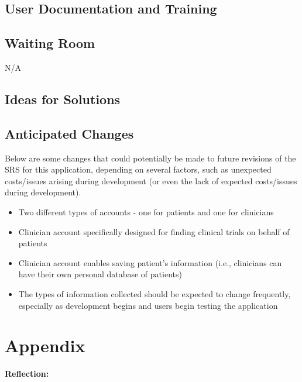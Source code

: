 \documentclass[12pt, titlepage]{article}
\begin{document}
\subsection{User Documentation and Training}

\subsection{Waiting Room}

N/A

\subsection{Ideas for Solutions}

\subsection{Anticipated Changes}

Below are some changes that could potentially be made to future 
revisions of the SRS for this application, depending on several factors,
such as unexpected costs/issues arising during development (or even the lack 
of expected costs/issues during development).

\begin{itemize}
    \item Two different types of accounts - one for patients and one for clinicians
    \item Clinician account specifically designed for finding clinical trials on behalf of patients
    \item Clinician account enables saving patient's information (i.e., clinicians can have their own personal database of patients)
    \item The types of information collected should be expected to change frequently, especially as development begins and users begin testing the application
\end{itemize}





\newpage

\section{Appendix}

\textbf{Reflection:}\\
\end{document}
